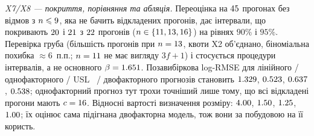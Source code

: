 \emph{X7/X8 --- покриття, порівняння та абляція.}
Переоцінка на $45$ прогонах без відмов з
$n\leqslant9$, яка не бачить відкладених прогонів, дає інтервали, що
покривають $20$ і $21$ з $22$
прогонів ($n \in \{11, 13, 16\}$) на рівнях $90\%$ і $95\%$. Перевірка груба
(більшість прогонів при $n=13$, квоти X2 об'єднано, біноміальна похибка
$\approx6$~п.п.; $n=11$ не має вигляду $3f+1$) і стосується процедури
інтервалів, а не основного $\beta=1.651$.
Позавибіркова log-RMSE для лінійного / однофакторного / USL~\cite{gunther2007} /
двофакторного прогнозів становить $1.329$, $0.523$,
$0.637$, $0.538$; однофакторний прогноз тут трохи точніший лише
тому, що всі відкладені прогони мають $c=16$. Відносні вартості визначення
розміру: $4.00$, $1.50$, $1.25$, $1.00$;
їх оцінює сама підігнана двофакторна модель, тож вони за побудовою на її користь.
